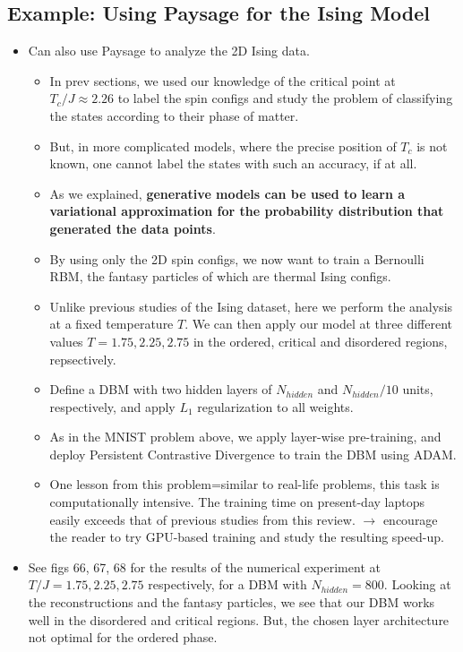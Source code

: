\documentclass[norsk,a4paper,11pt]{article}
\begin{document}
\subsection{Example: Using Paysage for the Ising Model}
\begin{itemize}
	\item Can also use Paysage to analyze the 2D Ising data. 
	\begin{itemize}
		\item In prev sections, we used our knowledge of the critical point at $T_c/J \approx 2.26$ to label the spin configs and study the problem of classifying the states according to their phase of matter.
		\item But, in more complicated models, where the precise position of $T_c$ is not known, one cannot label the states with such an accuracy, if at all. 
		\item As we explained, \textbf{generative models can be used to learn a variational approximation for the probability distribution that generated the data points}.
		\item By using only the 2D spin configs, we now want to train a Bernoulli RBM, the fantasy particles of which are thermal Ising configs. 
		\item Unlike previous studies of the Ising dataset, here we perform the analysis at a fixed temperature $T$. We can then apply our model at three different values $T=1.75, 2.25, 2.75$ in the ordered, critical and disordered regions, repsectively.
		\item Define a DBM with two hidden layers of $N_{hidden}$ and $N_{hidden}/10$ units, respectively, and apply $L_1$ regularization to all weights.
		\item As in the MNIST problem above, we apply layer-wise pre-training, and deploy Persistent Contrastive Divergence to train the DBM using ADAM.
		\item One lesson from this problem=similar to real-life problems, this task is computationally intensive. The training time on present-day laptops easily exceeds that of previous studies from this review. $\rightarrow$ encourage the reader to try GPU-based training and study the resulting speed-up.
	\end{itemize}
	\item See figs 66, 67, 68 for the results of the numerical experiment at $T/J = 1.75, 2.25, 2.75$ respectively, for a DBM with $N_{hidden} = 800$. Looking at the reconstructions and the fantasy particles, we see that our DBM works well in the disordered and critical regions. But, the chosen layer architecture not optimal for the ordered phase.
\end{itemize}
\end{document}
